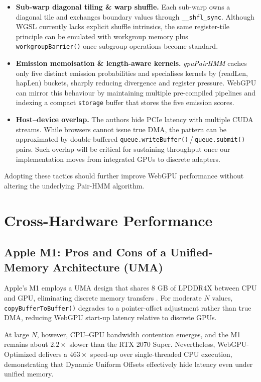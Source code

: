 \documentclass[PhD]{PHlab-thesis}
\begin{document}
\begin{itemize}
  \item \textbf{Sub-warp diagonal tiling \& warp shuffle.}  
        Each sub-warp owns a diagonal tile and exchanges boundary values through \texttt{\_\_shfl\_sync}.  
        Although WGSL currently lacks explicit shuffle intrinsics, the same register-tile principle can be emulated with workgroup memory plus \\ \texttt{workgroupBarrier()} once subgroup operations become standard.
  \item \textbf{Emission memoisation \& length-aware kernels.}  
        \textit{gpuPairHMM} caches only five distinct emission probabilities and specialises kernels by (readLen, hapLen) buckets, sharply reducing divergence and register pressure.  
        WebGPU can mirror this behaviour by maintaining multiple pre-compiled pipelines and indexing a compact \texttt{storage} buffer that stores the five emission scores.
  \item \textbf{Host–device overlap.}  
        The authors hide PCIe latency with multiple CUDA streams.  
        While browsers cannot issue true DMA, the pattern can be approximated by double-buffered \texttt{queue.writeBuffer()} / \texttt{queue.submit()} pairs.  
        Such overlap will be critical for sustaining throughput once our implementation moves from integrated GPUs to discrete adapters.
\end{itemize}

Adopting these tactics should further improve WebGPU performance without altering the underlying Pair-HMM algorithm.

\section{Cross-Hardware Performance}

\subsection{Apple M1: Pros and Cons of a Unified-Memory Architecture (UMA)}
Apple’s M1 employs a UMA design that shares 8 GB of LPDDR4X between CPU and GPU, eliminating discrete memory transfers \cite{Apple2020-m1}.  
For moderate $N$ values, \texttt{copyBufferToBuffer()} degrades to a pointer-offset adjustment rather than true DMA, reducing WebGPU start-up latency relative to discrete GPUs.

At large $N$, however, CPU–GPU bandwidth contention emerges, and the M1 remains about $2.2\times$ slower than the RTX 2070 Super.  
Nevertheless, WebGPU-Optimized delivers a $463\times$ speed-up over single-threaded CPU execution, demonstrating that Dynamic Uniform Offsets effectively hide latency even under unified memory.
\end{document}
